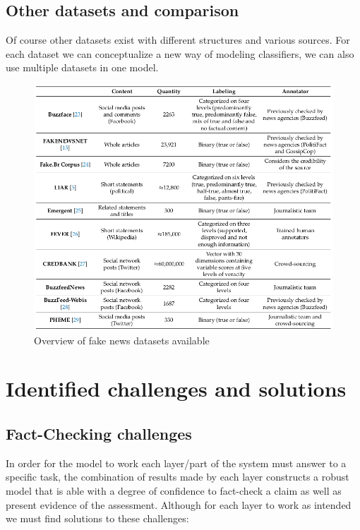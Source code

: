 \documentclass[10pt, english]{report}
\begin{document}
\newpage
\section{Other datasets and comparison \cite{de2021identifying}}
Of course other datasets exist with different structures and various sources. For each dataset we can conceptualize a new way of modeling classifiers, we can also use multiple datasets in one model.\\
 
\begin{figure}[H]
	\centering
	\includegraphics[scale=0.53]{img/datasets_comparison.png}
	\caption{Overview of fake news datasets available \cite{de2021identifying}}
\end{figure}


\chapter{Identified challenges and solutions}
\section{Fact-Checking challenges}
In order for the model to work each layer/part of the system must answer to a specific task, the combination of results made by each layer constructs a robust model that is able with a degree of confidence to fact-check a claim as well as present evidence of the assessment. Although for each layer to work as intended we must find solutions to these challenges:\\
\end{document}

